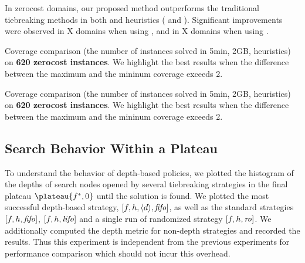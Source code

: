 

In zerocost domains, our proposed method outperforms the traditional
tiebreaking methods in both \lmcut and \mands heuristics
( and ).
Significant improvements were observed in X domains when using \lmcut,
and in X domains when using \mands.

\begin{table}[htbp]
 {
 \centering
 \setlength{\tabcolsep}{0.1em}
 
 \caption{
 Coverage comparison (the number of instances solved in 5min, 2GB, \lmcut heuristics) 
 on \textbf{620 zerocost instances}. We highlight the
 best results when the difference between the maximum and the mininum coverage exceeds 2.
 }
 \label{tbl:lmcut-zerocost-full}
 }
\end{table}

\begin{table}[htbp]
 {
 \centering
 \setlength{\tabcolsep}{0.1em}
 
 \caption{
 Coverage comparison (the number of instances solved in 5min, 2GB, \mands heuristics)
 on \textbf{620 zerocost instances}. We highlight the
 best results when the difference between the maximum and the mininum coverage exceeds 2.
 }
 \label{tbl:mands-zerocost-full}
 }
\end{table}

\subsection{Search Behavior Within a Plateau}

To understand the behavior of depth-based policies, we plotted the
histogram of the depths of search nodes opened by several tiebreaking
strategies in the final plateau $\plateau{f^*,0}$ until the solution is
found.  We plotted the most successful depth-based strategy,
$[f,h,{\left<d\right>},{\text{\textit{fifo}}}]$, as well as the standard strategies $[f,h,{\text{\textit{fifo}}}]$,
$[f,h,{\text{\textit{lifo}}}]$ and a single run of randomized strategy $[f,h,{\text{\textit{ro}}}]$.
We additionally computed the depth metric for non-depth strategies and
recorded the results. Thus this experiment is independent from the
previous experiments for performance comparison which should not incur
this overhead.


